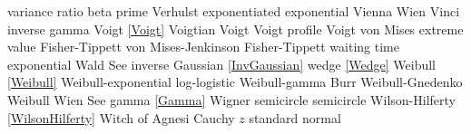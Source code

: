 variance ratio					\dotfill	beta prime 							\ncite	%
Verhulst						\dotfill	exponentiated exponential					 
Vienna 							\dotfill	Wien 								\ncite	%
Vinci 							\dotfill	inverse gamma 						\ncite	%
Voigt							\dotfill	\eqref{Voigt}						\ncite
Voigtian						\dotfill	Voigt								\ncite
Voigt profile					\dotfill	Voigt								\ncite
von Mises extreme value			\dotfill	Fisher-Tippett 						\ncite	%
von Mises-Jenkinson 			\dotfill	Fisher-Tippett 						\ncite	%
%
waiting time					\dotfill	exponential 						\ncite	%
Wald							\dotfill	See inverse Gaussian	 \eqref{InvGaussian}				\ncite	%
wedge							\dotfill	\eqref{Wedge}  						\ncite	%
Weibull 						\dotfill	\eqref{Weibull} 					\ncite	%
Weibull-exponential 			\dotfill	log-logistic 						\ncite	%
Weibull-gamma					\dotfill	Burr								\ncite	%
Weibull-Gnedenko				\dotfill	Weibull 							\ncite	%
Wien							\dotfill	See gamma \eqref{Gamma}				\ncite	%
Wigner semicircle				\dotfill	semicircle 							\ncite	%
Wilson-Hilferty					\dotfill	\eqref{WilsonHilferty} 				\ncite	%
Witch of Agnesi					\dotfill	Cauchy									%
%	
$z$								\dotfill	standard normal 					\ncite	%



\clearpage

